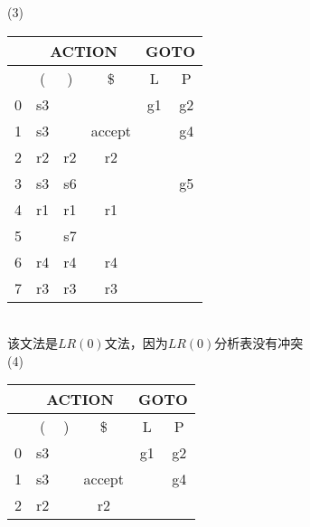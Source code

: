 \documentclass[a4paper, justified]{tufte-handout}
\begin{document}
\begin{solution}
(3) \\
\indent\indent
\begin{tabular}{|c|c|c|c|c|c|}
  \hline
                           & \multicolumn{3}{c|}{ACTION}        & \multicolumn{2}{c|}{GOTO} \\ \hline
                           & (                       & )  & \$   & L           & P           \\ \hline
  0                        & \multicolumn{1}{r|}{s3} &    &     & g1          & g2          \\ \hline
  1                        & s3                      &    & accept &             & g4          \\ \hline
  2                        & r2                      & r2 & r2  &             &             \\ \hline
  3                        & s3                      & s6 &     &             & g5          \\ \hline
  4                        & r1                      & r1 & r1  &             &             \\ \hline
  5                        &                         & s7 &     &             &             \\ \hline
  6                        & r4                      & r4 & r4  &             &             \\ \hline
  7                        & r3                      & r3 & r3  &             &             \\ \hline
  \end{tabular}
  \\
  \indent\indent 该文法是$LR(0)$文法，因为$LR(0)$分析表没有冲突\\ 
(4) \\
\indent\indent
\begin{tabular}{|c|c|c|c|c|c|}
  \hline
                           & \multicolumn{3}{c|}{ACTION}        & \multicolumn{2}{c|}{GOTO} \\ \hline
                           & (                       & )  & \$   & L           & P           \\ \hline
  0                        & s3                      &    &     & g1          & g2          \\ \hline
  1                        & s3                      &    & accept &             & g4          \\ \hline
  2                        & r2                      &  & r2  &             &             \\ \hline

\end{tabular}
\end{solution}
\end{document}
